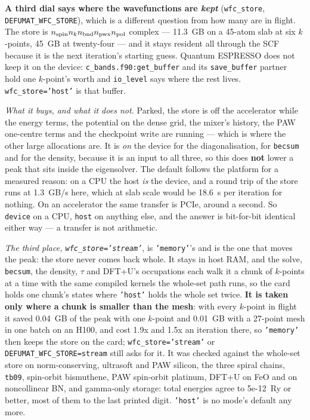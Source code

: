 \documentclass[11pt,a4paper]{article}
\newcommand{\qe}{Quantum ESPRESSO}
\newcommand{\code}[1]{\texttt{\small #1}}
\begin{document}
\textbf{A third dial says where the wavefunctions are \emph{kept}}
(\code{wfc\_store}, \code{DEFUMAT\_WFC\_STORE}), which is a different question
from how many are in flight. The store is $n_{\rm spin} n_k n_{\rm bnd}
n_{\rm pwx} n_{\rm pol}$ complex --- 11.3~GB on a 45-atom slab at six
$k$-points, 45~GB at twenty-four --- and it stays resident all through the SCF
because it is the next iteration's starting guess. \qe{} does not keep it on the
device: \code{c\_bands.f90:get\_buffer} and its \code{save\_buffer} partner hold
one $k$-point's worth and \code{io\_level} says where the rest lives.
\code{wfc\_store='host'} is that buffer.

\emph{What it buys, and what it does not.} Parked, the store is off the
accelerator while the energy terms, the potential on the dense grid, the mixer's
history, the PAW one-centre terms and the checkpoint write are running ---
which is where the other large allocations are. It is \emph{on} the device for
the diagonalisation, for \code{becsum} and for the density, because it is an
input to all three, so this does \textbf{not} lower a peak that sits inside the
eigensolver. The default follows the platform for a measured reason: on a CPU
the host \emph{is} the device, and a round trip of the store runs at 1.3~GB/s
here, which at slab scale would be 18.6~s per iteration for nothing. On an
accelerator the same transfer is PCIe, around a second. So \code{device} on a
CPU, \code{host} on anything else, and the answer is bit-for-bit identical
either way --- a transfer is not arithmetic.

\emph{The third place, \code{wfc\_store='stream'}}, is \code{'memory'}'s and is
the one that moves the peak: the store never comes back whole. It stays in
host RAM, and the solve, \code{becsum}, the density, $\tau$ and DFT+U's
occupations each walk it a chunk of $k$-points at a time with the same compiled
kernels the whole-set path runs, so the card holds one chunk's states where
\code{'host'} holds the whole set twice. \textbf{It is taken only where a chunk
is smaller than the mesh}: with every $k$-point in flight it saved 0.04~GB of
the peak with one $k$-point and 0.01~GB with a 27-point mesh in one batch on an
H100, and cost 1.9x and 1.5x an iteration there, so \code{'memory'} then keeps
the store on the card; \code{wfc\_store='stream'} or
\code{DEFUMAT\_WFC\_STORE=stream} still asks for it. It was checked against the whole-set
store on norm-conserving, ultrasoft and PAW silicon, the three spiral chains,
\code{tb09}, spin-orbit bismuthene, PAW spin-orbit platinum, DFT+U on FeO
and on noncollinear BN, and gamma-only storage: total energies agree to 5e-12~Ry or better, most of them
to the last printed digit. \code{'host'} is no mode's default any more.
\end{document}
